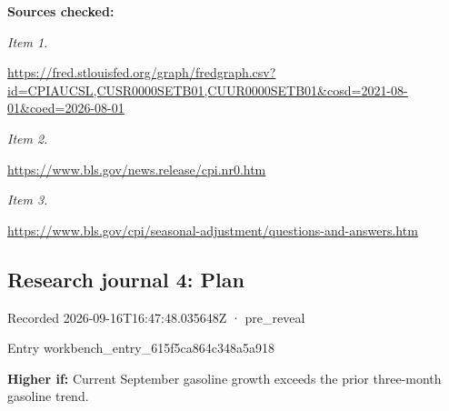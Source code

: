 \documentclass[11pt]{article}
\begin{document}
\par\noindent\textbf{Sources checked:} \par \par\noindent\textit{Item 1.}\par \href{https://fred.stlouisfed.org/graph/fredgraph.csv?id=CPIAUCSL,CUSR0000SETB01,CUUR0000SETB01\&cosd=2021-08-01\&coed=2026-08-01}{https://fred\hspace{0pt}.stlouisfed.\hspace{0pt}org/graph/fr\hspace{0pt}edgraph.csv?\hspace{0pt}id=CPIAUCSL,\hspace{0pt}CUSR0000SETB\hspace{0pt}01,CUUR0000S\hspace{0pt}ETB01\&cosd=2\hspace{0pt}021-08-01\&co\hspace{0pt}ed=2026-08-0\hspace{0pt}1}

\par\noindent\textit{Item 2.}\par \href{https://www.bls.gov/news.release/cpi.nr0.htm}{https://www.\hspace{0pt}bls.gov/news\hspace{0pt}.release/cpi\hspace{0pt}.nr0.htm}

\par\noindent\textit{Item 3.}\par \href{https://www.bls.gov/cpi/seasonal-adjustment/questions-and-answers.htm}{https://www.\hspace{0pt}bls.gov/cpi/\hspace{0pt}seasonal-adj\hspace{0pt}ustment/ques\hspace{0pt}tions-and-an\hspace{0pt}swers.htm}

\subsection*{\textcolor{epdarkgreen}{Research journal 4: Plan}}
Recorded 2026-09-16T16:47:48.035648Z · pre\_reveal


Entry workbench\_en\hspace{0pt}try\_615f5ca8\hspace{0pt}64c348a5a918


\par\noindent\textbf{Higher if:} Current September gasoline growth exceeds the prior three-month gasoline trend.
\end{document}
